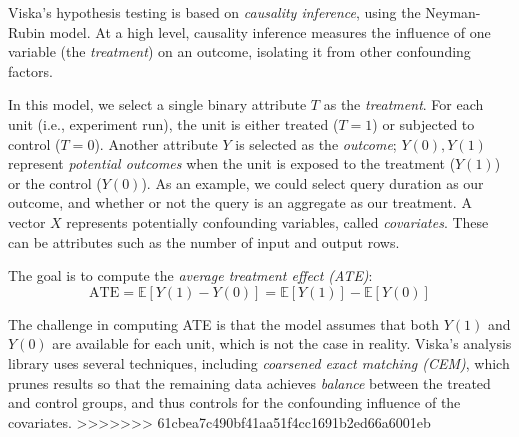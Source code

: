 Viska's hypothesis testing is based on \emph{causality inference},
using the Neyman-Rubin model. At a high level, causality inference
measures the influence of one variable (the \emph{treatment})
on an outcome, isolating it from other confounding factors.

In this model, we select a single binary attribute $T$ as the
\emph{treatment}.  For each unit (i.e., experiment run), the unit is either
treated ($T = 1$) or subjected to control ($T = 0$).  Another attribute $Y$ is
selected as the \emph{outcome}; $Y(0), Y(1)$ represent \emph{potential
outcomes} when the unit is exposed to the treatment ($Y(1)$) or the control
($Y(0)$). As an example, we could select query duration as our outcome, and
whether or not the query is an aggregate as our treatment.
A vector $X$ represents potentially confounding variables, called \emph{covariates}.
These can be attributes such as the number of input and output rows.

The goal is to compute the \emph{average treatment effect (ATE)}:
$$
\text{ATE} = \mathbb{E}[Y(1) - Y(0)] = \mathbb{E}[Y(1)] - \mathbb{E}[Y(0)]
$$

The challenge in computing ATE is that the model assumes that both
$Y(1)$ and $Y(0)$ are available for each unit, which is not the case
in reality.
Viska's analysis library uses several techniques, including
\emph{coarsened exact matching (CEM)}, which
prunes results so that the remaining data achieves \emph{balance}
between the treated and control groups, and thus controls for the confounding
influence of the covariates.
>>>>>>> 61cbea7c490bf41aa51f4cc1691b2ed66a6001eb
